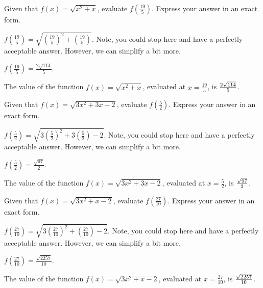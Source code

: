 \begin{shuffle}
\begin{exercise}
Given that $f(x)=\sqrt{x^2+x}$, evaluate $f\left(\frac{19}{5}\right)$. Express your answer in an exact form.
\begin{solution}
\begin{hint}
$f\left(\frac{19}{5}\right)=\sqrt{(\frac{19}{5})^2+(\frac{19}{5})}$. Note, you could stop here and have a perfectly acceptable answer. However, we can simplify a bit more. 
\end{hint}
\begin{hint}
$f\left(\frac{19}{5}\right)=\frac{2 \sqrt{114}}{5}$.
\end{hint}
The value of the function $f(x) = \sqrt{x^2+x}$, evaluated at $x=\frac{19}{5}$, is ${\frac{2 \sqrt{114}}{5}}$.
\end{solution}
\end{exercise}

\begin{exercise}
Given that $f(x)=\sqrt{3 x^2+3 x-2}$, evaluate $f\left(\frac{5}{2}\right)$. Express your answer in an exact form.
\begin{solution}
\begin{hint}
$f\left(\frac{5}{2}\right)=\sqrt{3 (\frac{5}{2})^2+3 (\frac{5}{2})-2}$. Note, you could stop here and have a perfectly acceptable answer. However, we can simplify a bit more. 
\end{hint}
\begin{hint}
$f\left(\frac{5}{2}\right)=\frac{\sqrt{97}}{2}$.
\end{hint}
The value of the function $f(x) = \sqrt{3 x^2+3 x-2}$, evaluated at $x=\frac{5}{2}$, is ${\frac{\sqrt{97}}{2}}$.
\end{solution}
\end{exercise}

\begin{exercise}
Given that $f(x)=\sqrt{3 x^2+x-2}$, evaluate $f\left(\frac{27}{10}\right)$. Express your answer in an exact form.
\begin{solution}
\begin{hint}
$f\left(\frac{27}{10}\right)=\sqrt{3 (\frac{27}{10})^2+(\frac{27}{10})-2}$. Note, you could stop here and have a perfectly acceptable answer. However, we can simplify a bit more. 
\end{hint}
\begin{hint}
$f\left(\frac{27}{10}\right)=\frac{\sqrt{2257}}{10}$.
\end{hint}
The value of the function $f(x) = \sqrt{3 x^2+x-2}$, evaluated at $x=\frac{27}{10}$, is ${\frac{\sqrt{2257}}{10}}$.
\end{solution}
\end{exercise}


\end{shuffle}
